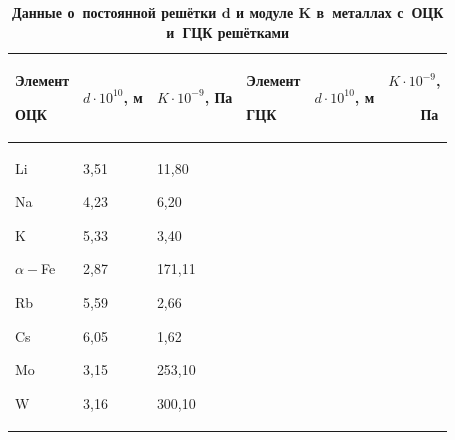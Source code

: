 \begin{table}[b!]

\centering



\begin{minipage}{.88\textwidth}

\centering

\caption{\bf Данные о~постоянной решётки $\boldsymbol d$ и модуле $\boldsymbol K$ в~металлах с~ОЦК и~ГЦК решётками}

\vspace{-3mm}

\begin{tabular}{p{1.8cm}|p{1.4cm}|p{1.4cm}|p{1.8cm}|p{1.4cm}|p{1.4cm}}

\hline \centering

Элемент \par ОЦК& \centering

$d\cdot 10^{10}$, м& \centering

$K\cdot 10^{-9}$, Па & \centering

Элемент \par ГЦК& \centering

$d\cdot 10^{10}$, м & { 

\centering

$K\cdot 10^{-9}$, \par ~~~~Па } 

\\

\hline \centering

Li \par Na \par K \par $\alpha -$Fe \par Rb \par Cs \par Mo \par W& \centering

3,51 \par 4,23 \par 5,33 \par 2,87 \par 5,59 \par 6,05 \par 3,15 \par 3,16& \centering

11,80 \par 6,20 \par 3,40 \par 171,11 \par 2,66 \par 1,62 \par 253,10 \par 300,10& \centering


\end{tabular}
\end{minipage}
\end{table}
